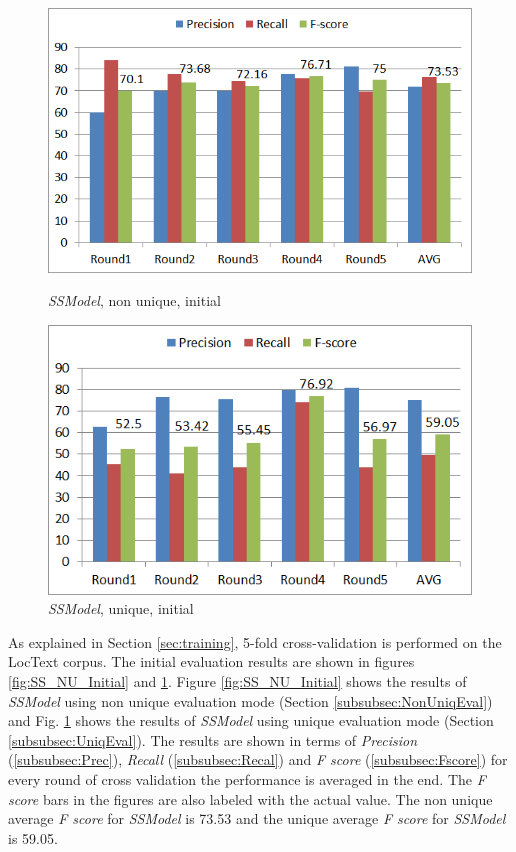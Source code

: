 \begin{figure}
\centering
\begin{minipage}{.5\textwidth}
  \centering
  \includegraphics[width=.95\textwidth]{figures/SSInitialResultsNUniq.png}
  \caption{\textit{SSModel}, non unique, initial}
  \label{fig:SS_NU_Initial}
\end{minipage}%
\begin{minipage}{.5\textwidth}
  \centering
  \includegraphics[width=.95\textwidth]{figures/SSInitialResultsUniq.png}
  \caption{\textit{SSModel}, unique, initial}
  \label{fig:SS_U_Initial}
\end{minipage}
\end{figure}

As explained in Section \ref{sec:training}, 5-fold cross-validation is performed on the LocText corpus. The initial evaluation results are shown in figures \ref{fig:SS_NU_Initial} and \ref{fig:SS_U_Initial}. Figure \ref{fig:SS_NU_Initial} shows the results of \textit{SSModel} using non unique evaluation mode (Section \ref{subsubsec:NonUniqEval}) and Fig. \ref{fig:SS_U_Initial} shows the results of \textit{SSModel} using unique evaluation mode (Section \ref{subsubsec:UniqEval}). The results are shown in terms of \textit{Precision} (\ref{subsubsec:Prec}), \textit{Recall} (\ref{subsubsec:Recal}) and \textit{F score} (\ref{subsubsec:Fscore}) for every round of cross validation the performance is averaged in the end. The \textit{F score} bars in the figures are also labeled with the actual value. The non unique average \textit{F score} for \textit{SSModel} is 73.53 and the unique average \textit{F score} for \textit{SSModel} is 59.05.

